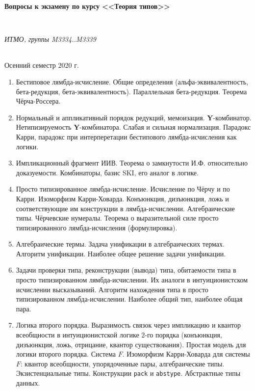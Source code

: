 \documentclass[11pt,a4paper,oneside]{article}
\begin{document}
\begin{center}
\begin{Large}{\bfseries Вопросы к экзамену по курсу <<Теория типов>>}\end{Large}\\
\vspace{1mm}
\begin{small} \itshape ИТМО, группы M3334..M3339\end{small}\\
\small Осенний семестр 2020 г.
\end{center}

\begin{enumerate}
\item Бестиповое лямбда-исчисление. Общие определения (альфа-эквивалентность, бета-редукция, бета-эквивалентность).
Параллельная бета-редукция. Теорема Чёрча-Россера.
\item Нормальный и аппликативный порядок редукций, мемоизация. \textbf{Y}-комбинатор.
Нетипизируемость \textbf{Y}-комбинатора. Слабая и сильная нормализация.
Парадокс Карри, парадокс при интерперетации бестипового лямбда-исчисления как логики.
\item Импликационный фрагмент ИИВ. Теорема о замкнутости И.Ф. относительно доказуемости.
Комбинаторы, базис SKI, его аналог в логике.
\item Просто типизированное лямбда-исчисление. Исчисление по Чёрчу и по Карри. Изоморфизм Карри-Ховарда.
Конъюнкция, дизъюнкция, ложь и соответствующие им конструкции в лямбда-исчислении. Алгебраические типы.
Чёрчевские нумералы. Теорема о выразительной силе просто типизированного лямбда-исчисления (формулировка).
\item Алгебраические термы. Задача унификации в алгебраических термах. Алгоритм унификации. Наиболее общее решение задачи унификации.
\item Задачи проверки типа, реконструкции (вывода) типа, обитаемости типа в просто типизированном лямбда-исчислении.
Их аналоги в интуиционистском исчислении высказываний. 
Алгоритм нахождения типа в просто типизированном лямбда-исчислении. Наиболее общий тип, наиболее общая пара.
\item Логика второго порядка. Выразимость связок через импликацию и квантор всеобщности в интуиционистской логике 
2-го порядка (конъюнкция, дизъюнкция, ложь, отрицание, квантор существования). Простая модель для логики второго порядка.
Система $F$. Изоморфизм Карри-Ховарда для системы $F$: квантор всеобщности, упорядоченные пары, алгебраические типы.
Экзистенциальные типы. Конструкции \texttt{pack} и \texttt{abstype}. Абстрактные типы данных. 

\end{enumerate}
\end{document}
